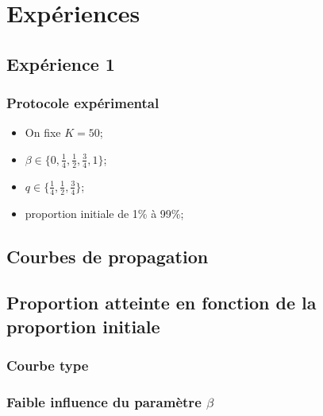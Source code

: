 \documentclass{beamer}
\newcommand{\resultat}[1]{
  \fontsize{8}{10}\selectfont
  \begin{center}
  
  \end{center}
}
\begin{document}
\section{Expériences}
\subsection{Expérience 1}
\begin{frame}
  \frametitle{Protocole expérimental}
  \begin{itemize}
    \item<1->On fixe $K=50$;
    \item<2->$\beta \in \{0,\frac{1}{4},\frac{1}{2},\frac{3}{4},1\}$;
    \item<3->$q\in \{\frac{1}{4}, \frac{1}{2}, \frac{3}{4}\}$;
    \item<4->proportion initiale de 1\% à 99\%;
  \end{itemize}
\end{frame}

\subsection{Courbes de propagation}

\subsection{Proportion atteinte en fonction de la proportion initiale}
\begin{frame}
  \frametitle{Courbe type}
  \resultat{random_finale_f_initiale_q50_Beta50_ec}
\end{frame}

\begin{frame}
  \frametitle{Faible influence du paramètre $\beta$}
   {\resultat{random_finale_f_initiale_q50_Beta0_ec}}
   {\resultat{random_finale_f_initiale_q50_Beta25_ec}}
   {\resultat{random_finale_f_initiale_q50_Beta50_ec}}
   {\resultat{random_finale_f_initiale_q50_Beta75_ec}}
   {\resultat{random_finale_f_initiale_q50_Beta100_ec}}
\end{frame}
\end{document}
